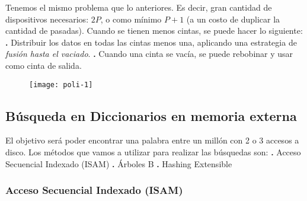 \documentclass[10pt,a4paper]{article}
\begin{document}
Tenemos el mismo problema que lo anteriores. Es decir, gran cantidad de dispositivos necesarios: $2P$, o como mínimo $P+1$ (a un costo de duplicar la cantidad de pasadas).
\newline
\newline
Cuando se tienen menos cintas, se puede hacer lo siguiente:
\newline
\newline
\textbf{.} Distribuir los datos en todas las cintas menos una, aplicando una estrategia de \textit{fusión hasta el vaciado}.
\newline
\newline
\textbf{.} Cuando una cinta se vacía, se puede rebobinar y usar como cinta de salida.
\newline
\newline
\begin{figure}[h]
	\centering
\texttt{[image: poli-1]}
	\label{drivers1}
\end{figure}      

\subsection{Búsqueda en Diccionarios en memoria externa}

El objetivo será poder encontrar una palabra entre un millón con 2 o 3 accesos a disco.
\newline
\newline
Los métodos que vamos a utilizar para realizar las búsquedas son:
\newline
\newline
\textbf{.} Acceso Secuencial Indexado (ISAM)
\newline
\newline
\textbf{.} Árboles B
\newline
\newline
\textbf{.} Hashing Extensible

\subsubsection{Acceso Secuencial Indexado (ISAM)}
\end{document}
